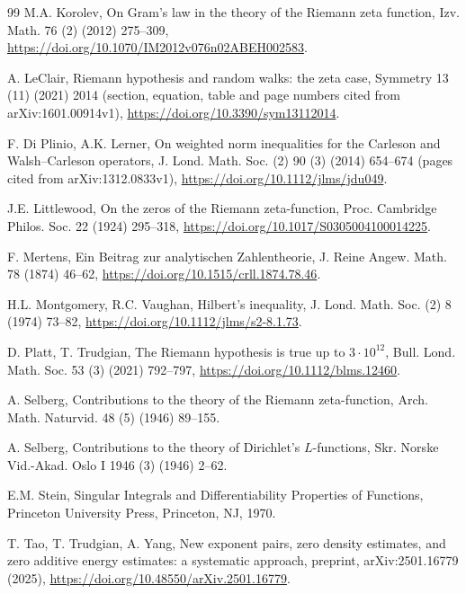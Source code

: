 \documentclass[preprint,12pt]{elsarticle}
\numberwithin{equation}{section}
\theoremstyle{plain}
\theoremstyle{definition}
\theoremstyle{remark}
\begin{document}
\begin{thebibliography}{99}
M.A. Korolev, On Gram's law in the theory of the Riemann zeta function, Izv. Math. 76 (2) (2012) 275--309, \href{https://doi.org/10.1070/IM2012v076n02ABEH002583}{https://doi.org/10.1070/IM2012v076n02ABEH002583}.


A. LeClair, Riemann hypothesis and random walks: the zeta case, Symmetry 13 (11) (2021) 2014 (section, equation, table and page numbers cited from arXiv:1601.00914v1), \href{https://doi.org/10.3390/sym13112014}{https://doi.org/10.3390/sym13112014}.

F. Di Plinio, A.K. Lerner, On weighted norm inequalities for the Carleson and Walsh--Carleson operators, J. Lond. Math. Soc. (2) 90 (3) (2014) 654--674 (pages cited from arXiv:1312.0833v1), \href{https://doi.org/10.1112/jlms/jdu049}{https://doi.org/10.1112/jlms/jdu049}.

J.E. Littlewood, On the zeros of the Riemann zeta-function, Proc. Cambridge Philos. Soc. 22 (1924) 295--318, \href{https://doi.org/10.1017/S0305004100014225}{https://doi.org/10.1017/S0305004100014225}.

F. Mertens, Ein Beitrag zur analytischen Zahlentheorie, J. Reine Angew. Math. 78 (1874) 46--62, \href{https://doi.org/10.1515/crll.1874.78.46}{https://doi.org/10.1515/crll.1874.78.46}.

H.L. Montgomery, R.C. Vaughan, Hilbert's inequality, J. Lond. Math. Soc. (2) 8 (1974) 73--82, \href{https://doi.org/10.1112/jlms/s2-8.1.73}{https://doi.org/10.1112/jlms/s2-8.1.73}.

D. Platt, T. Trudgian, The Riemann hypothesis is true up to $3\cdot10^{12}$, Bull. Lond. Math. Soc. 53 (3) (2021) 792--797, \href{https://doi.org/10.1112/blms.12460}{https://doi.org/10.1112/blms.12460}.

A. Selberg, Contributions to the theory of the Riemann zeta-function, Arch. Math. Naturvid. 48 (5) (1946) 89--155.

A. Selberg, Contributions to the theory of Dirichlet's $L$-functions, Skr. Norske Vid.-Akad. Oslo I 1946 (3) (1946) 2--62.

E.M. Stein, Singular Integrals and Differentiability Properties of Functions, Princeton University Press, Princeton, NJ, 1970.

T. Tao, T. Trudgian, A. Yang, New exponent pairs, zero density estimates, and zero additive energy estimates: a systematic approach, preprint, arXiv:2501.16779 (2025), \href{https://doi.org/10.48550/arXiv.2501.16779}{https://doi.org/10.48550/arXiv.2501.16779}.


\end{thebibliography}
\end{document}
